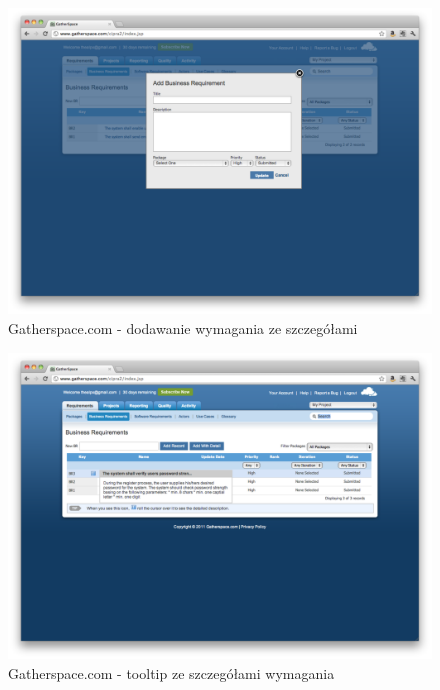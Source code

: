         \begin{figure}[t]
          \centering
          \includegraphics[width=1.0\textwidth]{img/gatherspace_5.pdf}
          \caption{Gatherspace.com - dodawanie wymagania ze szczegółami}
          \label{fig:gatherspace_5}
        \end{figure}

        \begin{figure}[t]
          \centering
          \includegraphics[width=1.0\textwidth]{img/gatherspace_6.pdf}
          \caption{Gatherspace.com - tooltip ze szczegółami wymagania}
          \label{fig:gatherspace_6}
        \end{figure}

